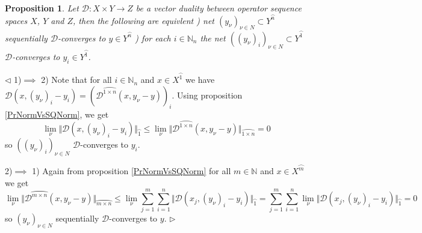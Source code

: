\documentclass[12pt]{article}
\newtheorem{proposition}[theorem]{Proposition}
\newenvironment{proof}{\par $\triangleleft$}{$\triangleright$}
\begin{document}
\begin{proposition}\label{PrDConvEquivCoordwsConv} Let $\mathcal{D}:X\times Y\to Z$ be a vector duality between operator sequence spaces $X$, $Y$ and $Z$, then the following are equivlent
) net $(y_\nu)_{\nu\in N}\subset Y^{\wideparen{n}}$ sequentially $\mathcal{D}$-converges to $y\in Y^{\wideparen{n}}$
) for each $i\in\mathbb{N}_n$ the net $( (y_\nu)_i)_{\nu\in N}\subset Y^{\wideparen{1}}$ $\mathcal{D}$-converges to $y_i\in Y^{\wideparen{1}}$.
\end{proposition}
\begin{proof}
1)$\implies$ 2) Note that for all $i\in\mathbb{N}_n$ and $x\in X^{\wideparen{1}}$ we have $\mathcal{D}(x,(y_\nu)_i-y_i)=(\mathcal{D}^{\wideparen{1\times n}}(x,y_\nu-y))_i$. Using proposition \ref{PrNormVsSQNorm}, we get
$$
\lim\limits_{\nu}\Vert \mathcal{D}(x,(y_\nu)_i-y_i)\Vert_{\wideparen{1}}
\leq\lim\limits_{\nu}\Vert \mathcal{D}^{\wideparen{1\times n}}(x,y_\nu-y)\Vert_{\wideparen{1\times n}}=0
$$
so $((y_\nu)_i)_{\nu\in N}$ $\mathcal{D}$-converges to $y_i$.

2)$\implies$ 1) Again from proposition \ref{PrNormVsSQNorm} for all $m\in\mathbb{N}$ and $x\in X^{\wideparen{m}}$ we get
$$
\lim\limits_{\nu}\Vert\mathcal{D}^{\wideparen{m\times n}}(x,y_\nu-y)\Vert_{\wideparen{m\times n}}
\leq\lim\limits_{\nu}\sum\limits_{j=1}^{m}\sum\limits_{i=1}^n\Vert\mathcal{D}(x_j,(y_\nu)_i-y_i)\Vert_{\wideparen{1}}
=\sum\limits_{j=1}^{m}\sum\limits_{i=1}^n\lim\limits_{\nu}\Vert\mathcal{D}(x_j,(y_\nu)_i-y_i)\Vert_{\wideparen{1}}=0
$$
so $(y_\nu)_{\nu\in N}$ sequentially $\mathcal{D}$-converges to $y$.
\end{proof}
\end{document}
